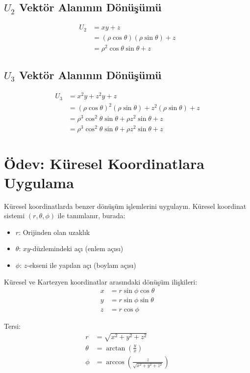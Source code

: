 \documentclass[11pt,letterpaper,twocolumn]{fenbil}
\begin{document}
\subsection*{$U_2$ Vektör Alanının Dönüşümü}
\begin{align}
    U_2 &= xy + z \\
    &= (\rho\cos\theta)(\rho\sin\theta) + z \\
    &= \rho^2\cos\theta\sin\theta + z
\end{align}

\subsection*{$U_3$ Vektör Alanının Dönüşümü}
\begin{align}
    U_3 &= x^2y + z^2y + z \\
    &= (\rho\cos\theta)^2(\rho\sin\theta) + z^2(\rho\sin\theta) + z \\
    &= \rho^3\cos^2\theta\sin\theta + \rho z^2\sin\theta + z \\
    &= \rho^3\cos^2\theta\sin\theta + \rho z^2\sin\theta + z
\end{align}

\section*{Ödev: Küresel Koordinatlara Uygulama}

Küresel koordinatlarda benzer dönüşüm işlemlerini uygulayın. Küresel koordinat sistemi $(r, \theta, \phi)$ ile tanımlanır, burada:
\begin{itemize}
    \item $r$: Orijinden olan uzaklık
    \item $\theta$: $xy$-düzlemindeki açı (enlem açısı)
    \item $\phi$: $z$-ekseni ile yapılan açı (boylam açısı)
\end{itemize}

Küresel ve Kartezyen koordinatlar arasındaki dönüşüm ilişkileri:
\begin{align}
    x &= r\sin\phi\cos\theta \\
    y &= r\sin\phi\sin\theta \\
    z &= r\cos\phi
\end{align}

Tersi:
\begin{align}
    r &= \sqrt{x^2 + y^2 + z^2} \\
    \theta &= \arctan\left(\frac{y}{x}\right) \\
    \phi &= \arccos\left(\frac{z}{\sqrt{x^2 + y^2 + z^2}}\right)
\end{align}
\end{document}

